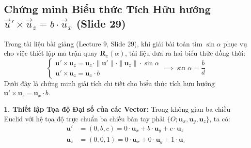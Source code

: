 \subsection{Chứng minh Biểu thức Tích Hữu hướng \texorpdfstring{$\vec{u}' \times \vec{u}_z = b \cdot \vec{u}_x$}{u' x uz = b * ux} (Slide 29)}
\label{subsec:proof_cross_product_slide29}

Trong tài liệu bài giảng (Lecture 9, Slide 29), khi giải bài toán tìm $\sin\alpha$ phục vụ cho việc thiết lập ma trận quay $\mathbf{R}_x(\alpha)$, tài liệu đưa ra hai biểu thức đồng thời:
\begin{equation}
\label{eq:slide29_system}
\begin{cases}
\mathbf{u}' \times \mathbf{u}_z = \mathbf{u}_x \cdot \|\mathbf{u}'\| \cdot \|\mathbf{u}_z\| \cdot \sin\alpha \\
\mathbf{u}' \times \mathbf{u}_z = \mathbf{u}_x \cdot b
\end{cases}
\implies \sin\alpha = \frac{b}{d}
\end{equation}
Dưới đây là chứng minh giải tích chi tiết cho biểu thức tích hữu hướng $\mathbf{u}' \times \mathbf{u}_z = \mathbf{u}_x \cdot b$.

\textbf{1. Thiết lập Tọa độ Đại số của các Vector:}
Trong không gian ba chiều Euclid với hệ tọa độ trực chuẩn ba chiều bàn tay phải $\{O; \mathbf{u}_x, \mathbf{u}_y, \mathbf{u}_z\}$, ta có:
\begin{align}
\mathbf{u}' &= (0, b, c) = 0 \cdot \mathbf{u}_x + b \cdot \mathbf{u}_y + c \cdot \mathbf{u}_z \\
\mathbf{u}_z &= (0, 0, 1) = 0 \cdot \mathbf{u}_x + 0 \cdot \mathbf{u}_y + 1 \cdot \mathbf{u}_z
\end{align}

